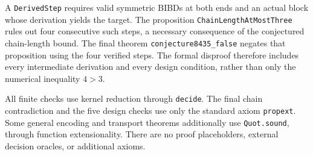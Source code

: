 \documentclass[10pt]{article}
\begin{document}
A \texttt{DerivedStep} requires valid symmetric BIBDs at both ends and an actual block whose derivation yields the target. The proposition \texttt{ChainLengthAtMostThree} rules out four consecutive such steps, a necessary consequence of the conjectured chain-length bound. The final theorem \texttt{conjecture8435\_false} negates that proposition using the four verified steps. The formal disproof therefore includes every intermediate derivation and every design condition, rather than only the numerical inequality $4>3$.

All finite checks use kernel reduction through \texttt{decide}. The final chain contradiction and the five design checks use only the standard axiom \texttt{propext}. Some general encoding and transport theorems additionally use \texttt{Quot.sound}, through function extensionality. There are no proof placeholders, external decision oracles, or additional axioms.
\end{document}
